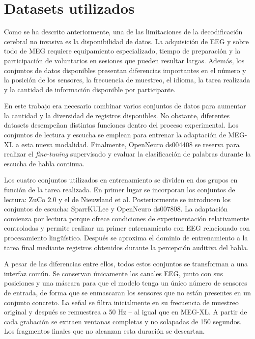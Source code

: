 
\chapter{Datasets utilizados}

Como se ha descrito anteriormente, una de las limitaciones de la decodificación cerebral no invasiva es la disponibilidad de datos. La adquisición de EEG y sobre todo de MEG requiere equipamiento especializado, tiempo de preparación y la participación de voluntarios en sesiones que pueden resultar largas. Además, los conjuntos de datos disponibles presentan diferencias importantes en el número y la posición de los sensores, la frecuencia de muestreo, el idioma, la tarea realizada y la cantidad de información disponible por participante.

En este trabajo era necesario combinar varios conjuntos de datos para aumentar la cantidad y la diversidad de registros disponibles. No obstante, diferentes datasets desempeñan distintas funciones dentro del proceso experimental. Los conjuntos de lectura y escucha se emplean para entrenar la adaptación de MEG-XL a esta nueva modalidad. Finalmente, OpenNeuro ds004408 se reserva para realizar el \textit{fine-tuning} supervisado y evaluar la clasificación de palabras durante la escucha de habla continua.

Los cuatro conjuntos utilizados en entrenamiento se dividen en dos grupos en función de la tarea realizada. En primer lugar se incorporan los conjuntos de lectura: ZuCo 2.0 y el de Nieuwland et al. Posteriormente se introducen los conjuntos de escucha: SparrKULee y OpenNeuro ds007808. La adaptación comienza por lectura porque ofrece condiciones de experimentación relativamente controladas y permite realizar un primer entrenamiento con EEG relacionado con procesamiento lingüístico. Después se aproxima el dominio de entrenamiento a la tarea final mediante registros obtenidos durante la percepción auditiva del habla.

A pesar de las diferencias entre ellos, todos estos conjuntos se transforman a una interfaz común. Se conservan únicamente los canales EEG, junto con sus posiciones y una máscara para que el modelo tenga un único número de sensores de entrada, de forma que se enmascaran los sensores que no están presentes en un conjunto concreto. La señal se filtra inicialmente en su frecuencia de muestreo original y después se remuestrea a 50 Hz -- al igual que en MEG-XL. A partir de cada grabación se extraen ventanas completas y no solapadas de 150 segundos. Los fragmentos finales que no alcanzan esta duración se descartan.

